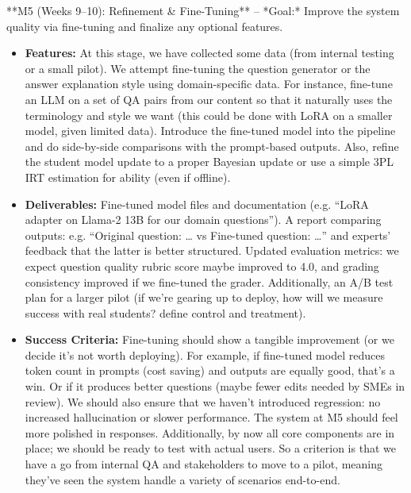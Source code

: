 \documentclass[11pt]{article}
\begin{document}
**M5 (Weeks 9–10): Refinement \& Fine-Tuning** – *Goal:* Improve the system quality via fine-tuning and finalize any optional features.
  \begin{itemize}
    \item \textbf{Features:} At this stage, we have collected some data (from internal testing or a small pilot). We attempt fine-tuning the question generator or the answer explanation style using domain-specific data. For instance, fine-tune an LLM on a set of QA pairs from our content so that it naturally uses the terminology and style we want (this could be done with LoRA on a smaller model, given limited data). Introduce the fine-tuned model into the pipeline and do side-by-side comparisons with the prompt-based outputs. Also, refine the student model update to a proper Bayesian update or use a simple 3PL IRT estimation for ability (even if offline).
    \item \textbf{Deliverables:} Fine-tuned model files and documentation (e.g. “LoRA adapter on Llama-2 13B for our domain questions”). A report comparing outputs: e.g. “Original question: … vs Fine-tuned question: …” and experts’ feedback that the latter is better structured. Updated evaluation metrics: we expect question quality rubric score maybe improved to 4.0, and grading consistency improved if we fine-tuned the grader. Additionally, an A/B test plan for a larger pilot (if we’re gearing up to deploy, how will we measure success with real students? define control and treatment).
    \item \textbf{Success Criteria:} Fine-tuning should show a tangible improvement (or we decide it’s not worth deploying). For example, if fine-tuned model reduces token count in prompts (cost saving) and outputs are equally good, that’s a win. Or if it produces better questions (maybe fewer edits needed by SMEs in review). We should also ensure that we haven’t introduced regression: no increased hallucination or slower performance. The system at M5 should feel more polished in responses. Additionally, by now all core components are in place; we should be ready to test with actual users. So a criterion is that we have a go from internal QA and stakeholders to move to a pilot, meaning they’ve seen the system handle a variety of scenarios end-to-end.
  \end{itemize}
\end{document}
